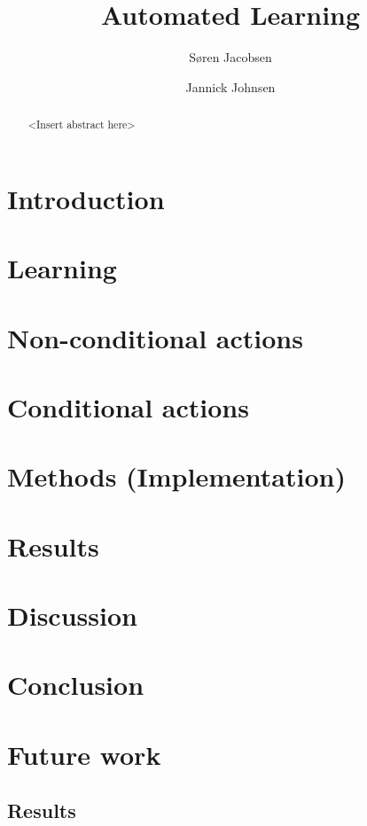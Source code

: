 \documentclass[english]{report}
\title {Automated Learning}
\author {Søren Jacobsen \and Jannick Johnsen}
\theoremstyle{definition}
\theoremstyle{plain}
\begin{document}
\newcommand{\master}{.}
\graphicspath{{Graphics/}}

\maketitle

\begin{abstract}
    <Insert abstract here>
\end{abstract}

\tableofcontents
\listofalgorithms

\chapter{Introduction} 
	

\chapter{Learning} \label{sec:Learning}
    

\chapter{Non-conditional actions}
    

\chapter{Conditional actions}
    

\chapter{Methods (Implementation)}
    

\chapter{Results}

\chapter{Discussion}

\chapter{Conclusion}

\chapter{Future work}

\begin{appendices}
    \chapter{Results}
    
\end{appendices}

{}

\end{document}
